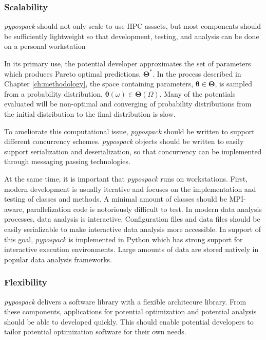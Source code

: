 \subsubsection{Scalability}

\emph{pypospack} should not only scale to use HPC asssets, but most components should be sufficiently lightweight so that development, testing, and analysis can be done on a personal workstation

In its primary use, the potential developer approximates the set of parameters  which produces Pareto optimal predictions, $\bm{\Theta}^*$.
In the process described in Chapter \ref{ch:methodology}, the space containing parameters, $\bm{\theta} \in \bm{\Theta}$, is sampled from a probability distribution, $\bm{\theta}(\omega) \in \bm{\Theta}(\Omega)$.
Many of the potentials evaluated will be non-optimal and converging of probability distributions from the initial distribution to the final distribution is slow.

To ameliorate this computational issue, \emph{pypospack} should be written to support different concurrency schemes.  \emph{pypospack} objects should be written to easily support serialization and deserialization, so that concurrency can be implemented through messaging passing technologies.

At the same time, it is important that \emph{pypospack} runs on workstations.  First, modern development is usually iterative and focuses on the implementation and testing of classes and methods.  A minimal amount of classes should be MPI-aware, parallelization code is notoriously difficult to test.
In modern data analysis processes, data analysis is interactive.  Configuration files and data files should be easily serializable to make interactive data analysis more accessible.
In support of this goal, \emph{pypospack} is implemented in Python which has strong support for interactive execution environments.  Large amounts of data are stored natively in popular data analysis frameworks.

\subsubsection{Flexibility}

\emph{pypospack} delivers a software library with a flexible architecure library.  From these components, applications for potential optimization and potential analysis should be able to developed quickly.  This should enable potential developers to tailor potential optimization software for their own needs.

